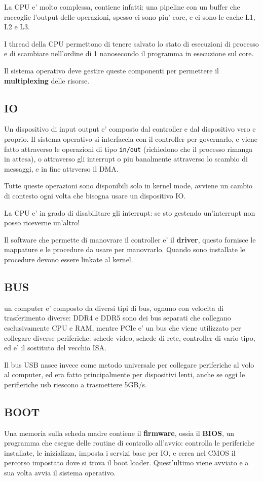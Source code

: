 La CPU e' molto complessa, contiene infatti: una pipeline con un buffer che raccoglie l'output delle operazioni,
spesso ci sono piu' core, e ci sono le cache L1, L2 e L3. 

I thread della CPU permettono di tenere salvato lo stato di esecuzioni di processo e 
di scambiare nell'ordine di 1 nanosecondo il programma in esecuzione sul core.

Il sistema operativo deve gestire queste componenti per permettere il \textbf{multiplexing} delle risorse.

\subsection{IO}
Un dispositivo di input output e' composto dal controller e dal dispositivo vero e proprio.
Il sistema operativo si interfaccia con il controller per governarlo, e viene fatto
attraverso le operazioni di tipo \texttt{in/out} (richiedono che il processo rimanga in attesa), o 
attraverso gli interrupt o piu banalmente attraverso lo scambio di messaggi, e in fine attrverso il DMA.

Tutte queste operazioni sono disponibili solo in kernel mode, avviene un cambio di contesto ogni volta 
che bisogna usare un dispositivo IO.

La CPU e' in grado di disabilitare gli interrupt: se sto gestendo un'interrupt non posso riceverne un'altro!

Il software che permette di manovrare il controller e' il \textbf{driver}, questo fornisce
le mappature e le procedure da usare per manovrarlo. Quando sono installate le procedure devono essere
linkate al kernel.

\subsection{BUS}
un computer e' composto da diversi tipi di bus, ognuno con velocita di trasferimento diverse:
DDR4 e DDR5 sono dei bus separati che collegano esclusivamente CPU e RAM, mentre PCIe e'
un bus che viene utilizzato per collegare diverse periferiche: schede video, schede di rete, controller 
di vario tipo, ed e' il sostituto del vecchio ISA.

Il bus USB nasce invece come metodo universale per collegare periferiche al volo al computer,
ed era fatto principalmente per dispositivi lenti, anche se oggi le perifieriche usb riescono 
a trasmettere 5GB/s.

\subsection{BOOT}
Una memoria sulla scheda madre contiene il \textbf{firmware}, ossia il 
\textbf{BIOS}, un programma che esegue delle routine di controllo all'avvio: controlla le periferiche
installate, le inizializza, imposta i servizi base per IO, e cerca nel CMOS il percorso impostato
dove si trova il boot loader. Quest'ultimo viene avviato e a sua volta avvia il sistema operativo.

